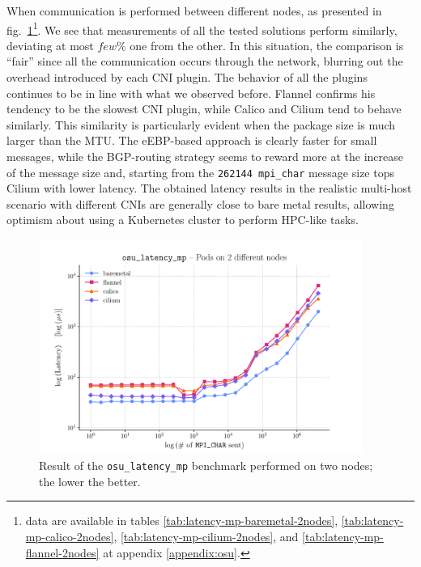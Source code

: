 When communication is performed between different nodes, as presented in
fig.~\ref{fig:latency-mp-2-nodes}\footnote{data are available in tables
\ref{tab:latency-mp-baremetal-2nodes}, \ref{tab:latency-mp-calico-2nodes},
\ref{tab:latency-mp-cilium-2nodes}, and \ref{tab:latency-mp-flannel-2nodes} at
appendix \ref{appendix:osu}.}. We see that measurements of all the tested
solutions perform similarly, deviating at most $few\%$ one from the other. In
this situation, the comparison is ``fair'' since all the communication occurs
through the network, blurring out the overhead introduced by each CNI plugin.
The behavior of all the plugins continues to be in line with what we observed
before. Flannel confirms his tendency to be the slowest CNI plugin, while Calico
and Cilium tend to behave similarly. This similarity is particularly evident
when the package size is much larger than the MTU. The eEBP-based approach is
clearly faster for small messages, while the BGP-routing strategy seems to
reward more at the increase of the message size and, starting from the
\texttt{262144 mpi\_char} message size tops Cilium with lower latency. The
obtained latency results in the realistic multi-host scenario with different
CNIs are generally close to bare metal results, allowing optimism about using a
Kubernetes cluster to perform HPC-like tasks.



\begin{figure}
  \centering
  \includegraphics[width=0.94\textwidth]{img/chpt3/latency_mp-2-nodes}
  \caption{Result of the \texttt{osu\_latency\_mp} benchmark performed on two
    nodes; the lower the better.}
  \label{fig:latency-mp-2-nodes}
\end{figure}

